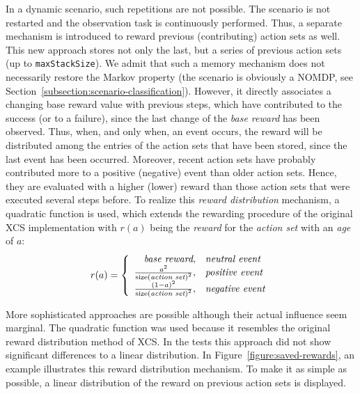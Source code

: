 In a dynamic scenario, such repetitions are not possible. The scenario is not restarted and the observation task is continuously performed. Thus, a separate mechanism is introduced to reward previous (contributing) action sets as well. This new approach stores not only the last, but a series of previous action sets (up to \verb|maxStackSize|). We admit that such a memory mechanism does not necessarily restore the Markov property (the scenario is obviously a NOMDP, see Section~\ref{subsection:scenario-classification}). However, it directly associates a changing base reward value with previous steps, which have contributed to the success (or to a failure), since the last change of the \emph{base reward} has been observed. %
Thus, when, and only when, an event occurs, the reward will be distributed among the entries of the action sets that have been stored, since the last event has been occurred. Moreover, recent action sets have probably contributed more to a positive (negative) event than older action sets. Hence, they are evaluated with a higher (lower) reward than those action sets that were executed several steps before. To realize this \emph{reward distribution} mechanism, a quadratic function is used, which extends the rewarding procedure of the original XCS implementation with $r(a)$ being the \emph{reward} for the \emph{action set} with an \emph{age} of $a$:
$$ %
	r(a) = 
	\left\{ \begin{array}{r@{,\quad}l}
		\emph{base reward} & \mbox{\emph{neutral event}}\\  	
		\frac{{a}^{2}}{{\mathrm{size(\emph{action set})}}^{2}} & \mbox{\emph{positive event}} \\
  		\frac{{(1 - a)}^{2}}{{\mathrm{size(\emph{action set})}}^{2}} & \mbox{\emph{negative event}}
  	\end{array} \right.
$$ %

More sophisticated approaches are possible although their actual influence seem marginal. The quadratic function was used because it resembles the original reward distribution method of XCS. In the tests this approach did not show significant differences to a linear distribution. In Figure~\ref{figure:saved-rewards}, an example illustrates this reward distribution mechanism. To make it as simple as possible, a linear distribution of the reward on previous action sets is displayed. 

